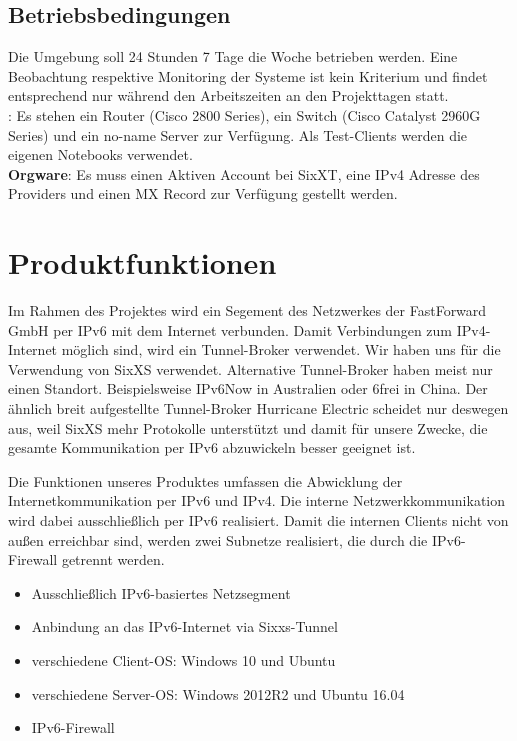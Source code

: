 \subsection{Betriebsbedingungen}

Die Umgebung soll 24 Stunden 7 Tage die Woche betrieben werden. Eine Beobachtung respektive Monitoring der Systeme ist kein Kriterium und findet entsprechend nur während den Arbeitszeiten an den Projekttagen statt.\\

: Es stehen ein Router (Cisco 2800 Series), ein Switch (Cisco Catalyst 2960G Series) und ein no-name Server zur Verfügung. Als Test-Clients werden die eigenen Notebooks verwendet.\\
{\bf Orgware}: Es muss einen Aktiven Account bei SixXT, eine IPv4 Adresse des Providers und einen MX Record zur Verfügung gestellt werden.
\section{Produktfunktionen}

Im Rahmen des Projektes wird ein Segement des Netzwerkes der FastForward GmbH per IPv6 mit dem Internet verbunden. Damit Verbindungen zum IPv4-Internet möglich sind, wird ein Tunnel-Broker verwendet. Wir haben uns für die Verwendung von SixXS verwendet. Alternative Tunnel-Broker haben meist nur einen Standort. Beispielsweise IPv6Now in Australien oder 6frei in China. Der ähnlich breit aufgestellte Tunnel-Broker Hurricane Electric scheidet nur deswegen aus, weil SixXS mehr Protokolle unterstützt und damit für unsere Zwecke, die gesamte Kommunikation per IPv6 abzuwickeln besser geeignet ist.

Die Funktionen unseres Produktes umfassen die Abwicklung der Internetkommunikation per IPv6 und IPv4. Die interne Netzwerkkommunikation wird dabei ausschließlich per IPv6 realisiert. Damit die internen Clients nicht von außen erreichbar sind, werden zwei Subnetze realisiert, die durch die IPv6-Firewall getrennt werden.

\begin{itemize}
	\item Ausschließlich IPv6-basiertes Netzsegment
	\item Anbindung an das IPv6-Internet via Sixxs-Tunnel
	\item verschiedene Client-OS: Windows 10 und Ubuntu
	\item verschiedene Server-OS: Windows 2012R2 und Ubuntu 16.04
	\item IPv6-Firewall
\end{itemize}

